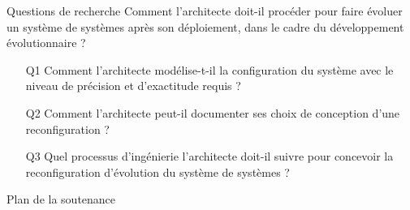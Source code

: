 

\begin{frame}{Questions de recherche}
Comment l’architecte doit-il procéder pour faire évoluer un système de systèmes après son déploiement, dans le cadre du développement évolutionnaire ?\\
\begin{itemize}
    \item[Q1] Comment l’architecte modélise-t-il la configuration du système avec le niveau de précision et d’exactitude requis ?
    \item[Q2] Comment l’architecte peut-il documenter ses choix de conception d’une reconfiguration ?
    \item[Q3] Quel processus d’ingénierie l’architecte doit-il suivre pour concevoir la reconfiguration d’évolution du système de systèmes ?
\end{itemize}
\end{frame}

\begin{frame}{Plan de la soutenance}
\tableofcontents
\end{frame}

